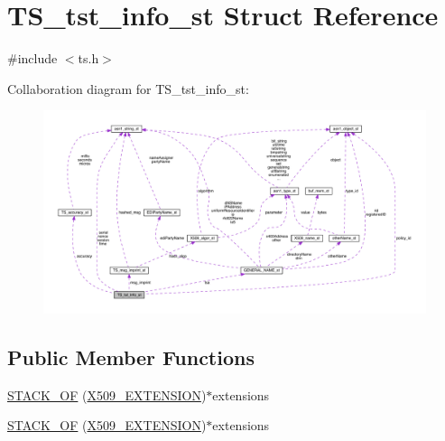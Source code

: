\hypertarget{struct_t_s__tst__info__st}{}\section{T\+S\+\_\+tst\+\_\+info\+\_\+st Struct Reference}
\label{struct_t_s__tst__info__st}


{\ttfamily \#include $<$ts.\+h$>$}



Collaboration diagram for T\+S\+\_\+tst\+\_\+info\+\_\+st\+:\nopagebreak
\begin{figure}[H]
\begin{center}
\leavevmode
\includegraphics[width=350pt]{struct_t_s__tst__info__st__coll__graph}
\end{center}
\end{figure}
\subsection*{Public Member Functions}
\begin{DoxyCompactItemize}
\item 
\hyperlink{struct_t_s__tst__info__st_a9674726b03b076fb4ef08b04c1417a0d}{S\+T\+A\+C\+K\+\_\+\+OF} (\hyperlink{crypto_2x509_2x509_8h_ab2f7f7dc0ced8684e0cbfc818e408304}{X509\+\_\+\+E\+X\+T\+E\+N\+S\+I\+ON})$\ast$extensions
\item 
\hyperlink{struct_t_s__tst__info__st_a9674726b03b076fb4ef08b04c1417a0d}{S\+T\+A\+C\+K\+\_\+\+OF} (\hyperlink{crypto_2x509_2x509_8h_ab2f7f7dc0ced8684e0cbfc818e408304}{X509\+\_\+\+E\+X\+T\+E\+N\+S\+I\+ON})$\ast$extensions
\end{DoxyCompactItemize}

